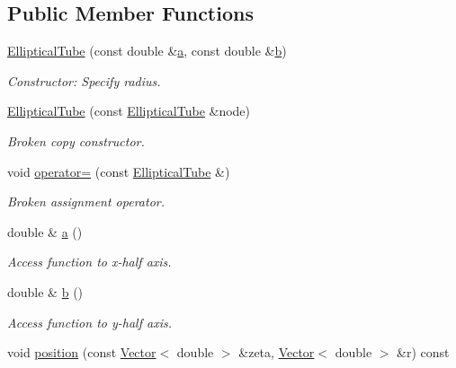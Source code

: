 \subsection*{Public Member Functions}
\begin{DoxyCompactItemize}
\item 
\hyperlink{classoomph_1_1EllipticalTube_a329dbc27caf2d9bfe02ad5e940b17aa6}{Elliptical\+Tube} (const double \&\hyperlink{classoomph_1_1EllipticalTube_a32555e753aaaf305979520c06b26755e}{a}, const double \&\hyperlink{classoomph_1_1EllipticalTube_a5ca528bf85b8c5f2f6b665046e8a613c}{b})
\begin{DoxyCompactList}\small\item\em Constructor\+: Specify radius. \end{DoxyCompactList}\item 
\hyperlink{classoomph_1_1EllipticalTube_a6b8312c32c02f67ba2a716e77f048a1f}{Elliptical\+Tube} (const \hyperlink{classoomph_1_1EllipticalTube}{Elliptical\+Tube} \&node)
\begin{DoxyCompactList}\small\item\em Broken copy constructor. \end{DoxyCompactList}\item 
void \hyperlink{classoomph_1_1EllipticalTube_a2f85c6d060b35fc390f1ed940bf2f53d}{operator=} (const \hyperlink{classoomph_1_1EllipticalTube}{Elliptical\+Tube} \&)
\begin{DoxyCompactList}\small\item\em Broken assignment operator. \end{DoxyCompactList}\item 
double \& \hyperlink{classoomph_1_1EllipticalTube_a32555e753aaaf305979520c06b26755e}{a} ()
\begin{DoxyCompactList}\small\item\em Access function to x-\/half axis. \end{DoxyCompactList}\item 
double \& \hyperlink{classoomph_1_1EllipticalTube_a5ca528bf85b8c5f2f6b665046e8a613c}{b} ()
\begin{DoxyCompactList}\small\item\em Access function to y-\/half axis. \end{DoxyCompactList}\item 
void \hyperlink{classoomph_1_1EllipticalTube_af7a879adbdba6f7fc1a1dd9c0b9378f6}{position} (const \hyperlink{classoomph_1_1Vector}{Vector}$<$ double $>$ \&zeta, \hyperlink{classoomph_1_1Vector}{Vector}$<$ double $>$ \&r) const

\end{DoxyCompactItemize}
